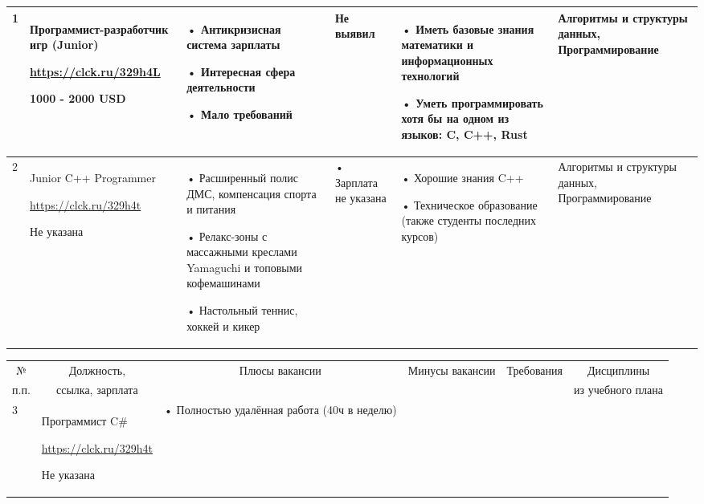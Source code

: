 \begin{landscape}
\begin{table}[H]
\begin{center}
\begin{small}
\begin{tabular}{|p{0.1cm}|p{5cm}|p{4.5cm}|p{4.5cm}|p{4cm}|p{3cm}|}
				1 & Программист-разработчик игр (Junior)
				
				\url{https://clck.ru/329h4L}
				
				1000 - 2000 USD &
				 • Антикризисная система зарплаты
				 
				 • Интересная сфера деятельности
				 
				 • Мало требований
				 &
				 Не выявил
				 &
				 • Иметь базовые знания математики и информационных технологий
				  
				 • Уметь программировать хотя бы на одном из языков: C, C++, Rust
				 &
				 Алгоритмы и структуры данных, Программирование
				\\
				\hline
				2 & Junior C++ Programmer
				
				\url{https://clck.ru/329h4t}
				
				Не указана	&
				 • Расширенный полис ДМС, компенсация спорта и питания
				
				• Релакс-зоны с массажными креслами Yamaguchi и топовыми кофемашинами
				
				• Настольный теннис, хоккей и кикер 
				&
				• Зарплата не указана
				&
				• Хорошие знания C++
				
				• Техническое образование (также студенты последних курсов)
				&
				Алгоритмы и структуры данных, Программирование
				\\
				\hline
			\end{tabular}
		\end{small}
	\end{center}
\end{table}
\begin{table}[H]
	\begin{center}
		\begin{small}
		\begin{tabular}{|p{0.1cm}|p{5cm}|p{4.5cm}|p{4.5cm}|p{4cm}|p{3cm}|} \hline
			\multicolumn{1}{|c|}{№}&\multicolumn{1}{c|}{Должность,}&\multicolumn{1}{c|}{Плюсы вакансии}&\multicolumn{1}{c|}{Минусы вакансии}&\multicolumn{1}{c|}{Требования}&\multicolumn{1}{c|}{Дисциплины}\\ 
			\multicolumn{1}{|c|}{п.п.}&\multicolumn{1}{c|}{ссылка, зарплата}&\multicolumn{1}{c|}{}&\multicolumn{1}{c|}{}&\multicolumn{1}{c|}{}&\multicolumn{1}{c|}{из учебного плана}\\ 
			\hline				
				3 & Программист C\#
				
				\url{https://clck.ru/329h4t}
				
				Не указана	&
				• Полностью удалённая работа (40ч в неделю)
				

\end{tabular}
\end{small}
\end{center}
\end{table}
\end{landscape}
